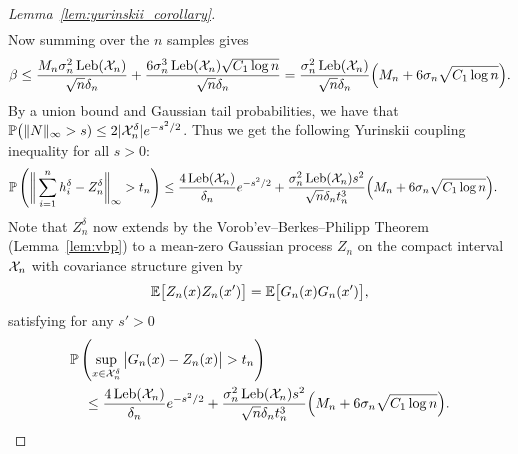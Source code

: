 \begin{proof}[Lemma~\ref{lem:yurinskii_corollary}]
\begin{align*}
  \end{align*}
  Now summing over the $n$ samples gives
  \begin{align*}
    \beta
    \leq
    \frac{M_n \sigma_n^2 \operatorname{Leb}(\mathcal{X}_n)}{\sqrt n \delta_n}
    + \frac{6\sigma_n^3 \operatorname{Leb}(\mathcal{X}_n) \sqrt{C_1 \log n}}
    {\sqrt n \delta_n}
    =
    \frac{\sigma_n^2 \operatorname{Leb}(\mathcal{X}_n)}{\sqrt n \delta_n}
    \Big(M_n + 6\sigma_n \sqrt{C_1 \log n}\Big).
  \end{align*}
  By a union bound
  and Gaussian tail probabilities,
  we have that
  $\mathbb{P}\big( \|N\|_\infty > s)
  \leq 2|\mathcal{X}_n^\delta| e^{-s^2/2}$.
  Thus we get the following Yurinskii coupling inequality
  for all $s > 0$:
  \begin{align*}
    \mathbb{P}\left(
      \bigg\|
      \sum_{i=1}^n
      h_i^\delta
      - Z_n^\delta
      \bigg\|_\infty
      > t_n
    \right)
    &\leq
    \frac{4 \operatorname{Leb}(\mathcal{X}_n)}{\delta_n}
    e^{-s^2/2}
    + \frac{\sigma_n^2 \operatorname{Leb}(\mathcal{X}_n) s^2}{\sqrt n \delta_n t_n^3}
    \Big(M_n + 6 \sigma_n \sqrt{C_1 \log n}\Big).
  \end{align*}
  Note that
  $Z_n^\delta$
  now extends
  by the Vorob'ev--Berkes--Philipp Theorem
  (Lemma~\ref{lem:vbp})
  to a mean-zero Gaussian
  process
  $Z_n$ on the compact interval $\mathcal{X}_n$
  with covariance structure given by
  \begin{align*}
    \mathbb{E}\big[
      Z_n(x)
      Z_n(x')
    \big]
    =
    \mathbb{E}\big[
      G_n(x)
      G_n(x')
    \big],
  \end{align*}
  satisfying for any $s' > 0$
  \begin{align*}
    &\mathbb{P}\left(
      \sup_{x \in \mathcal{X}_n^\delta}
      \big|
      G_n(x) - Z_n(x)
      \big|
      > t_n
    \right) \\
    &\quad\leq
    \frac{4 \operatorname{Leb}(\mathcal{X}_n)}{\delta_n}
    e^{-s^2/2}
    + \frac{\sigma_n^2 \operatorname{Leb}(\mathcal{X}_n) s^2}{\sqrt n \delta_n t_n^3}
    \Big(M_n + 6 \sigma_n \sqrt{C_1 \log n}\Big).
  \end{align*}



\end{proof}
